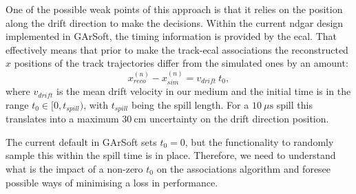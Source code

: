 One of the possible weak points of this approach is that it relies on the position along the drift direction to make the decisions. Within the current \gls{ndgar} design implemented in GArSoft, the timing information is provided by the \gls{ecal}. That effectively means that prior to make the track-\gls{ecal} associations the reconstructed $x$ positions of the track trajectories differ from the simulated ones by an amount:
\begin{equation}
	x_{reco}^{(n)} - x_{sim}^{(n)} = v_{drift} \ t_{0},
\end{equation}
where $v_{drift}$ is the mean drift velocity in our medium and the initial time is in the range $t_{0}\in[0, t_{spill})$, with $t_{spill}$ being the spill length. For a $10 \ \mu\mathrm{s}$ spill this translates into a maximum $30 \ \mathrm{cm}$ uncertainty on the drift direction position.

The current default in GArSoft sets $t_{0} = 0$, but the functionality to randomly sample this within the spill time is in place. Therefore, we need to understand what is the impact of a non-zero $t_{0}$ on the associations algorithm and foresee possible ways of minimising a loss in performance.

